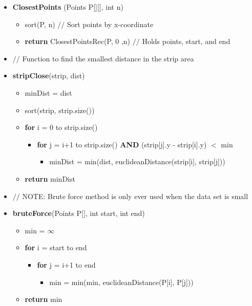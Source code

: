 \documentclass{article}[12pt]
\begin{document}
\begin{itemize}
  \item \textbf{ClosestPoints} (Points P[][], int n)
    \begin{itemize}
      \item sort(P, n) $//$ Sort points by x-coordinate
      \item \textbf{return} ClosestPointsRec(P, 0 ,n) $//$ Holds points, start, and end
    \end{itemize}
  \item $//$ Function to find the smallest distance in the strip area
  \item \textbf{stripClose}(strip, dist)
    \begin{itemize}
      \item minDist = dist
      \item sort(strip, strip.size())
      \item \textbf{for} i = 0 to strip.size()
        \begin{itemize}
          \item \textbf{for} j = i+1 to strip.size() \textbf{AND} (strip[j].y - strip[i].y) $<$ min
        \begin{itemize}
          \item minDist = min(dist, euclideanDistance(strip[i], strip[j]))
        \end{itemize}
        \end{itemize}
      \item \textbf{return} minDist
    \end{itemize}

  \item $//$ NOTE: Brute force method is only ever used when the data set is small
  \item \textbf{bruteForce}(Points P[], int start, int end)
    \begin{itemize}
      \item min = $\infty$
      \item \textbf{for} i = start to end
        \begin{itemize}
          \item \textbf{for} j = i+1 to end
            \begin{itemize}
              \item min = min(min, euclideanDistance(P[i], P[j]))
            \end{itemize}
        \end{itemize}
      \item \textbf{return} min
    \end{itemize}


\end{itemize}
\end{document}
